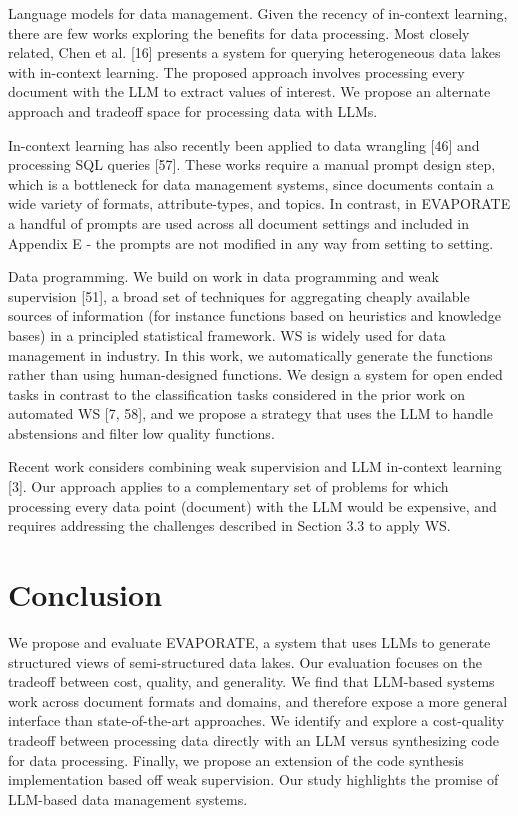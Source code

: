 \documentclass[10pt]{article}
\begin{document}
Language models for data management. Given the recency of in-context learning, there are few works exploring the benefits for data processing. Most closely related, Chen et al. [16] presents a system for querying heterogeneous data lakes with in-context learning. The proposed approach involves processing every document with the LLM to extract values of interest. We propose an alternate approach and tradeoff space for processing data with LLMs.

In-context learning has also recently been applied to data wrangling [46] and processing SQL queries [57]. These works require a manual prompt design step, which is a bottleneck for data management systems, since documents contain a wide variety of formats, attribute-types, and topics. In contrast, in EVAPORATE a handful of prompts are used across all document settings and included in Appendix E - the prompts are not modified in any way from setting to setting.

Data programming. We build on work in data programming and weak supervision [51], a broad set of techniques for aggregating cheaply available sources of information (for instance functions based on heuristics and knowledge bases) in a principled statistical framework. WS is widely used for data management in industry. In this work, we automatically generate the functions rather than using human-designed functions. We design a system for open ended tasks in contrast to the classification tasks considered in the prior work on automated WS [7, 58], and we propose a strategy that uses the LLM to handle abstensions and filter low quality functions.

Recent work considers combining weak supervision and LLM in-context learning [3]. Our approach applies to a complementary set of problems for which processing every data point (document) with the LLM would be expensive, and requires addressing the challenges described in Section 3.3 to apply WS.

\section{Conclusion}
We propose and evaluate EVAPORATE, a system that uses LLMs to generate structured views of semi-structured data lakes. Our evaluation focuses on the tradeoff between cost, quality, and generality. We find that LLM-based systems work across document formats and domains, and therefore expose a more general interface than state-of-the-art approaches. We identify and explore a cost-quality tradeoff between processing data directly with an LLM versus synthesizing code for data processing. Finally, we propose an extension of the code synthesis implementation based off weak supervision. Our study highlights the promise of LLM-based data management systems.
\end{document}
